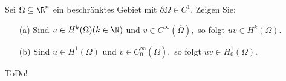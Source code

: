 
\begin{exercise}

  Sei $\Omega \subseteq \R^n$ ein beschränktes Gebiet mit $\partial\Omega \in C^1.$ Zeigen Sie:
  \begin{itemize}
      \item[(a)] Sind $u \in H^k(\Omega) (k \in \N)$ und $v \in C^\infty(\overline{\Omega}),$ so folgt $uv \in H^k(\Omega).$
       \item[(b)] Sind $u \in H^1(\Omega)$ und $v \in C_0^\infty(\overline{\Omega}),$ so folgt $uv \in H^1_0(\Omega).$
  \end{itemize}

\end{exercise}


\begin{solution}

ToDo!

\end{solution}

